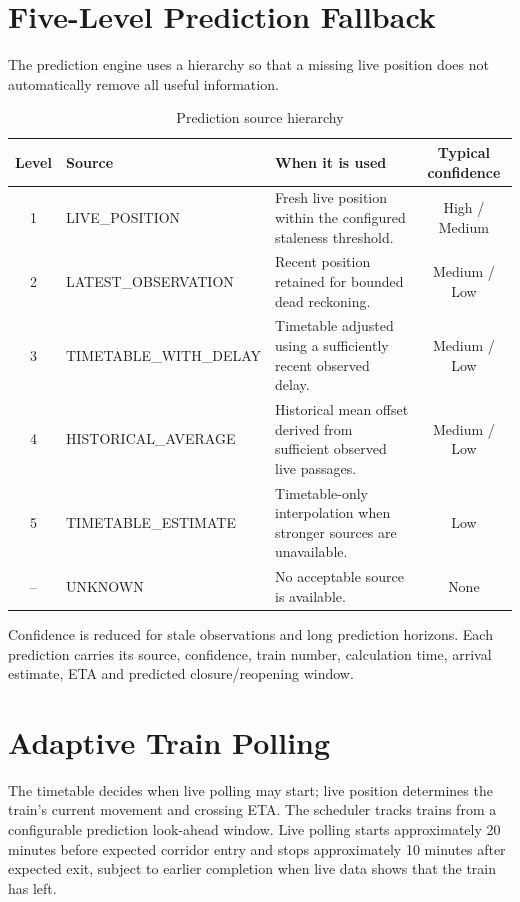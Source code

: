 \documentclass[11pt,a4paper]{report}
\begin{document}
\section{Five-Level Prediction Fallback}
The prediction engine uses a hierarchy so that a missing live position does not automatically remove all useful information.

\begin{table}[H]\centering
\caption{Prediction source hierarchy}
\label{tab:fallback}
\begin{tabularx}{\textwidth}{c p{3.1cm} X c}
\toprule
\textbf{Level} & \textbf{Source} & \textbf{When it is used} & \textbf{Typical confidence}\\
\midrule
1 & LIVE\_POSITION & Fresh live position within the configured staleness threshold. & High / Medium\\
2 & LATEST\_OBSERVATION & Recent position retained for bounded dead reckoning. & Medium / Low\\
3 & TIMETABLE\_WITH\_DELAY & Timetable adjusted using a sufficiently recent observed delay. & Medium / Low\\
4 & HISTORICAL\_AVERAGE & Historical mean offset derived from sufficient observed live passages. & Medium / Low\\
5 & TIMETABLE\_ESTIMATE & Timetable-only interpolation when stronger sources are unavailable. & Low\\
-- & UNKNOWN & No acceptable source is available. & None\\
\bottomrule
\end{tabularx}
\end{table}

Confidence is reduced for stale observations and long prediction horizons. Each prediction carries its source, confidence, train number, calculation time, arrival estimate, ETA and predicted closure/reopening window.

\section{Adaptive Train Polling}
The timetable decides when live polling may start; live position determines the train's current movement and crossing ETA. The scheduler tracks trains from a configurable prediction look-ahead window. Live polling starts approximately 20 minutes before expected corridor entry and stops approximately 10 minutes after expected exit, subject to earlier completion when live data shows that the train has left.
\end{document}
